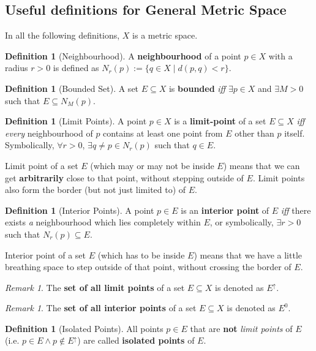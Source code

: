 \documentclass[a4paper,12pt]{report}
\newcommand{\tb}{\textbf}
\theoremstyle{plain}
\theoremstyle{definition}
\newtheorem{definition}[theorem]{\color{red}Definition} %
\theoremstyle{remark}
\newtheorem{remark}[theorem]{\color{ForestGreen}Remark} %
\begin{document}
\subsection{Useful definitions for General Metric Space}
In all the following definitions, $X$ is a metric space.
\begin{definition}[Neighbourhood]
A \tb{neighbourhood} of a point $p\in X$ with a radius $r>0$ is defined as $N_r(p):=\{q\in X\mid d(p,q)<r\}$.
\end{definition}
\begin{definition}[Bounded Set]
A set $E\subseteq X$ is \tb{bounded} \emph{iff} $\exists p\in X$ and $\exists M>0$ such that $E\subseteq N_M(p)$.
\end{definition}
\begin{definition}[Limit Points]
A point $p\in X$ is a \tb{limit-point} of a set $E\subseteq X$ \emph{iff} \emph{every} neighbourhood of $p$ contains at least one point from $E$ other than $p$ itself. Symbolically, $\forall r>0$, $\exists q\neq p\in N_r(p)$ such that $q\in E$.
\end{definition}
\begin{insight}
Limit point of a set $E$ (which may or may not be inside $E$) means that we can get \tb{arbitrarily} close to that point, without stepping outside of $E$. Limit points also form the border (but not just limited to) of $E$.
\end{insight}
\begin{definition}[Interior Points]
A point $p\in E$ is an \tb{interior point} of $E$ \emph{iff} there exists \emph{a} neighbourhood which lies completely within $E$, or symbolically, $\exists r>0$ such that $N_r(p)\subseteq E$.
\end{definition}
\begin{insight}
Interior point of a set $E$ (which has to be inside $E$) means that we have a little breathing space to step outside of that point, without crossing the border of $E$.
\end{insight}
\begin{remark}
The \tb{set of all limit points} of a set $E\subseteq X$ is denoted as $E^{\uparrow}$.
\end{remark}
\begin{remark}
The \tb{set of all interior points} of a set $E\subseteq X$ is denoted as $E^0$.
\end{remark}
\begin{definition}[Isolated Points]
All points $p\in E$ that are \tb{not} \emph{limit points} of $E$ (i.e. $p\in E\wedge p\notin E^{\uparrow}$) are called \tb{isolated points} of $E$.
\end{definition}
\end{document}
